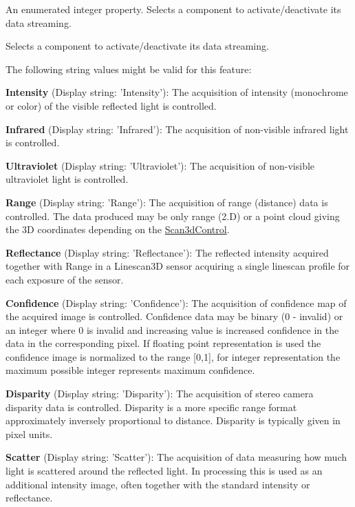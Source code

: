 An enumerated integer property. Selects a component to activate/deactivate its data streaming. 

Selects a component to activate/deactivate its data streaming.

The following string values might be valid for this feature\+:
\begin{DoxyItemize}
\item {\bfseries Intensity} (Display string\+: 'Intensity')\+: The acquisition of intensity (monochrome or color) of the visible reflected light is controlled.
\item {\bfseries Infrared} (Display string\+: 'Infrared')\+: The acquisition of non-\/visible infrared light is controlled.
\item {\bfseries Ultraviolet} (Display string\+: 'Ultraviolet')\+: The acquisition of non-\/visible ultraviolet light is controlled.
\item {\bfseries Range} (Display string\+: 'Range')\+: The acquisition of range (distance) data is controlled. The data produced may be only range (2.\+D) or a point cloud giving the 3\+D coordinates depending on the \hyperlink{classmv_i_m_p_a_c_t_1_1acquire_1_1_gen_i_cam_1_1_scan3d_control}{Scan3d\+Control}.
\item {\bfseries Reflectance} (Display string\+: 'Reflectance')\+: The reflected intensity acquired together with Range in a Linescan3\+D sensor acquiring a single linescan profile for each exposure of the sensor.
\item {\bfseries Confidence} (Display string\+: 'Confidence')\+: The acquisition of confidence map of the acquired image is controlled. Confidence data may be binary (0 -\/ invalid) or an integer where 0 is invalid and increasing value is increased confidence in the data in the corresponding pixel. If floating point representation is used the confidence image is normalized to the range \mbox{[}0,1\mbox{]}, for integer representation the maximum possible integer represents maximum confidence.
\item {\bfseries Disparity} (Display string\+: 'Disparity')\+: The acquisition of stereo camera disparity data is controlled. Disparity is a more specific range format approximately inversely proportional to distance. Disparity is typically given in pixel units.
\item {\bfseries Scatter} (Display string\+: 'Scatter')\+: The acquisition of data measuring how much light is scattered around the reflected light. In processing this is used as an additional intensity image, often together with the standard intensity or reflectance.
\end{DoxyItemize}

